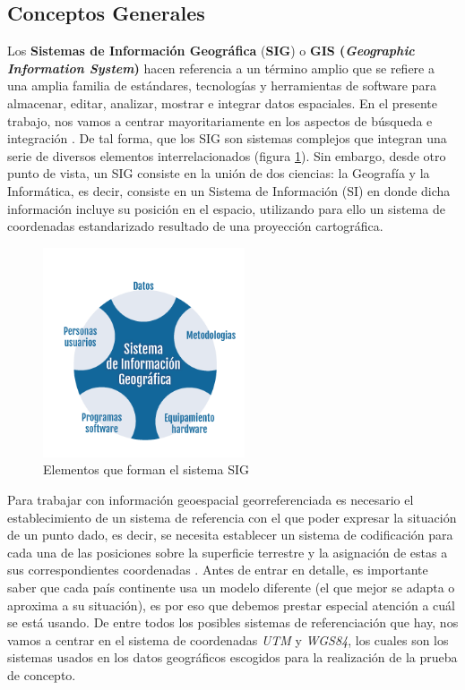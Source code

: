 

\subsection{Conceptos Generales}

Los \textbf{Sistemas de Información Geográfica} (\textbf{SIG}) o \textbf{GIS (\textit{Geographic Information System})} hacen referencia a un término amplio que se refiere a una amplia familia de estándares, tecnologías y herramientas de software para almacenar, editar, analizar, mostrar e integrar datos espaciales. En el presente trabajo, nos vamos a centrar mayoritariamente en los aspectos de búsqueda e integración \cite{tesis}. De tal forma, que los SIG son sistemas complejos que integran una serie de diversos elementos interrelacionados \cite{VictorOlaya} (figura \ref{fig:elementosSIG}). Sin embargo, desde otro punto de vista, un SIG consiste en la unión de dos ciencias: la Geografía y la Informática, es decir, consiste en un Sistema de Información (SI) en donde dicha información incluye su posición en el espacio, utilizando para ello un sistema de coordenadas estandarizado resultado de una proyección cartográfica. 

\begin{figure}[H]
	\centering
	\includegraphics[width=0.53\textwidth]{imagenes/capitulo2/graficoSig}
	\caption{Elementos que forman el sistema SIG}
	\label{fig:elementosSIG}
\end{figure}

Para trabajar con información geoespacial georreferenciada es necesario el establecimiento de un sistema de referencia con el que poder expresar la situación de un punto dado, es decir, se necesita establecer un sistema de codificación para cada una de las posiciones sobre la superficie terrestre y la asignación de estas a sus correspondientes coordenadas \cite{VictorOlaya}. Antes de entrar en detalle, es importante saber que cada país  continente usa un modelo diferente (el que mejor se adapta o aproxima a su situación), es por eso que debemos prestar especial atención a cuál se está usando. De entre todos los posibles sistemas de referenciación que hay, nos vamos a centrar en el sistema de coordenadas \textit{UTM} y \textit{WGS84}, los cuales son los sistemas usados en los datos geográficos escogidos para la realización de la prueba de concepto.

